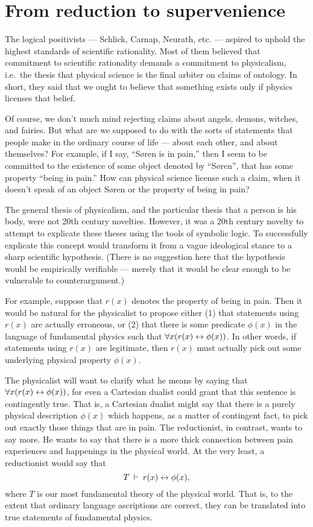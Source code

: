 \section*{From reduction to supervenience}

The logical positivists --- Schlick, Carnap, Neurath, etc. --- aspired
to uphold the highest standards of scientific rationality.  Most of
them believed that commitment to scientific rationality demands a
commitment to physicalism, i.e.\ the thesis that physical science is
the final arbiter on claims of ontology.  In short, they said that we
ought to believe that something exists only if physics licenses that
belief.

Of course, we don't much mind rejecting claims about angels, demons,
witches, and fairies.  But what are we supposed to do with the sorts
of statements that people make in the ordinary course of life ---
about each other, and about themselves?  For example, if I say,
``S{\o}ren is in pain,'' then I seem to be committed to the existence
of some object denoted by ``S{\o}ren'', that has some property ``being
in pain.''  How can physical science license such a claim, when it
doesn't speak of an object S{\o}ren or the property of being in pain?

The general thesis of physicalism, and the particular thesis that a
person is his body, were not 20th century novelties.  However, it was
a 20th century novelty to attempt to explicate these theses using the
tools of symbolic logic.  To successfully explicate this concept would
transform it from a vague ideological stance to a sharp scientific
hypothesis.  (There is no suggestion here that the hypothesis would be
empirically verifiable --- merely that it would be clear enough to be
vulnerable to counterargument.)

For example, suppose that $r(x)$ denotes the property of being in
pain.  Then it would be natural for the physicalist to propose either
(1) that statements using $r(x)$ are actually erroneous, or (2) that
there is some predicate $\phi (x)$ in the language of fundamental
physics such that $\forall x(r(x)\leftrightarrow \phi (x))$.  In other words, if
statements using $r(x)$ are legitimate, then $r(x)$ must actually pick
out some underlying physical property $\phi (x)$.

The physicalist will want to clarify what he means by saying that
$\forall x(r(x)\leftrightarrow \phi (x))$, for even a Cartesian dualist could
grant that this sentence is contingently true.  That is, a Cartesian
dualist might say that there is a purely physical description
$\phi (x)$ which happens, as a matter of contingent fact, to pick out
exactly those things that are in pain.  The reductionist, in contrast,
wants to say more.  He wants to say that there is a more thick
connection between pain experiences and happenings in the physical
world.  At the very least, a reductionist would say that
\[ T \: \vdash \: r(x)\leftrightarrow \phi (x) ,\] where $T$ is our most
fundamental theory of the physical world.  That is, to the extent that
ordinary language ascriptions are correct, they can be translated into
true statements of fundamental physics.

